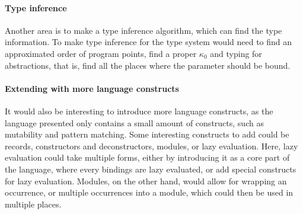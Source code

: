 \documentclass[../../master.tex]{subfiles}
\begin{document}
\paragraph{Type inference}
Another area is to make a type inference algorithm, which can find the type information.
To make type inference for the type system would need to find an approximated order of program points, find a proper $\kappa_0$ and typing for abstractions, that is, find all the places where the parameter should be bound.

\paragraph{Extending with more language constructs}
It would also be interesting to introduce more language constructs, as the language presented only contains a small amount of constructs, such as mutability and pattern matching.
Some interesting constructs to add could be records, constructors and deconstructors, modules, or lazy evaluation.
Here, lazy evaluation could take multiple forms, either by introducing it as a core part of the language, where every bindings are lazy evaluated, or add special constructs for lazy evaluation.
Modules, on the other hand, would allow for wrapping an occurrence, or multiple occurrences into a module, which could then be used in multiple places.
\end{document}
